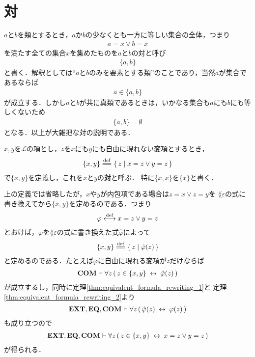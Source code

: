 \section{対}
	$a$と$b$を類とするとき，$a$か$b$の少なくとも一方に等しい集合の全体，つまり
	\begin{align}
		a = x \vee b = x
	\end{align}
	を満たす全ての集合$x$を集めたものを$a$と$b$の対と呼び
	\begin{align}
		\{a,b\}
	\end{align}
	と書く．解釈としては``$a$と$b$のみを要素とする類''のことであり，当然$a$が集合であるならば
	\begin{align}
		a \in \{a,b\}
	\end{align}
	が成立する．しかし$a$と$b$が共に真類であるときは，いかなる集合も$a$にも$b$にも等しくないため
	\begin{align}
		\{a,b\} = \emptyset
	\end{align}
	となる．以上が大雑把な対の説明である．
	
	\begin{screen}
		\begin{dfn}[対]
			$x,y$を$\mathcal{L}$の項とし，$z$を$x$にも$y$にも自由に現れない変項とするとき，
			\begin{align}
				\{x,y\} \defeq \Set{z}{x = z \vee y = z}
			\end{align}
			で$\{x,y\}$を定義し，これを$x$と$y$の{\bf 対}と呼ぶ．
			特に$\{x,x\}$を$\{x\}$と書く．
		\end{dfn}
	\end{screen}
	
	上の定義では省略したが，$x$や$y$が内包項である場合は$z = x \vee z = y$を
	$\lang{\varepsilon}$の式に書き換えてから$\{x,y\}$を定めるのである．つまり
	\begin{align}
		\varphi \overset{\mathrm{def}}{\longleftrightarrow} x = z \vee y = z
	\end{align}
	とおけば，$\varphi$を$\lang{\varepsilon}$の式に書き換えた式$\hat{\varphi}$によって
	\begin{align}
		\{x,y\} \defeq \Set{z}{\hat{\varphi}(z)}
	\end{align}
	と定めるのである．たとえば$\varphi$に自由に現れる変項が$z$だけならば
	\begin{align}
		\mbox{\bf COM} \vdash \forall z\, (\, z \in \{x,y\} \hspace{0.25em}\leftrightarrow\hspace{0.25em} \hat{\varphi}(z)\, )
	\end{align}
	が成立するし，同時に定理\ref{thm:equivalent_formula_rewriting_1}と
	定理\ref{thm:equivalent_formula_rewriting_2}より
	\begin{align}
		\mbox{{\bf EXT}},\mbox{{\bf EQ}},\mbox{\bf COM} \vdash 
		\forall z\, (\, \hat{\varphi}(z) \hspace{0.25em}\leftrightarrow\hspace{0.25em} \varphi(z)\, )
	\end{align}
	も成り立つので
	\begin{align}
		\mbox{{\bf EXT}},\mbox{{\bf EQ}},\mbox{\bf COM} \vdash 
		\forall z\, (\, z \in \{x,y\} \hspace{0.25em}\leftrightarrow\hspace{0.25em} x = z \vee y = z\, )
	\end{align}
	が得られる．
	
